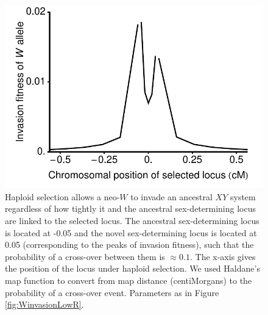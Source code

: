 \documentclass[12pt]{article}
\begin{document}
\begin{figure}
\centering
\includegraphics[width=0.5\linewidth]{InvasionVsCentiMorgansAllOrders}
\caption{
Haploid selection allows a neo-$W$ to invade an ancestral $XY$ system regardless of how tightly it and the ancestral sex-determining locus are linked to the selected locus. 
The ancestral sex-determining locus is located at -0.05 and the novel sex-determining locus is located at 0.05 (corresponding to the peaks of invasion fitness), such that the probability of a cross-over between them is $\approx0.1$.
The x-axis gives the position of the locus under haploid selection.
We used Haldane's map function \citep[Equation 3 in ][]{Haldane1919} to convert from map distance (centiMorgans) to the probability of a cross-over event. 
Parameters as in Figure \ref{fig:WinvasionLowR}.
}
\label{fig:InvasionVsCentiMorgans}
\end{figure}
\end{document}
